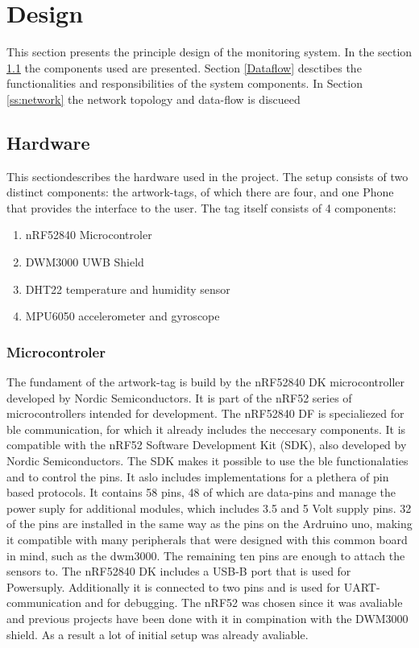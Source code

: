 \chapter{Design}
\label{c:design}

This section presents the principle design of the monitoring system.
In the section \ref{ss:hardware} the components used are presented.
Section \ref{Dataflow} desctibes the functionalities and responsibilities of the system components.
In Section \ref{ss:network} the network topology and data-flow is discueed

\section{Hardware}
\label{ss:hardware}

This sectiondescribes the hardware used in the project. The setup consists of two distinct components: the artwork-tags, of which there are four, and one Phone that provides the interface to the user. The tag itself consists of 4 components:
\begin{enumerate}
	\item nRF52840 Microcontroler
	\item DWM3000 UWB Shield
	\item DHT22 temperature and humidity sensor
	\item MPU6050 accelerometer and gyroscope
\end{enumerate}

\subsection{Microcontroler}
The fundament of the artwork-tag is build by the nRF52840 DK microcontroller developed by Nordic Semiconductors. 
It is part of the nRF52 series of microcontrollers intended for development.
The nRF52840 DF is specialiezed for ble communication, for which it already includes the neccesary components.
It is compatible with the nRF52 Software Development Kit (SDK), also developed by Nordic Semiconductors.
The SDK makes it possible to use the ble functionalaties and to control the pins. It aslo includes implementations for a plethera of pin based protocols.
It contains 58 pins, 48 of which are data-pins and manage the power suply for additional modules, which includes 3.5 and 5 Volt supply pins.
32 of the pins are installed in the same way as the pins on the Ardruino uno, making it compatible with many peripherals that were designed with this common board in mind, such as the dwm3000.
The remaining ten pins are enough to attach the sensors to.
The nRF52840 DK includes a USB-B port that is used for Powersuply. Additionally it is connected to two pins and is used for UART-communication and for debugging.
The nRF52 was chosen since it was avaliable and previous projects have been done with it in compination with the DWM3000 shield.
As a result a lot of initial setup was already avaliable.

